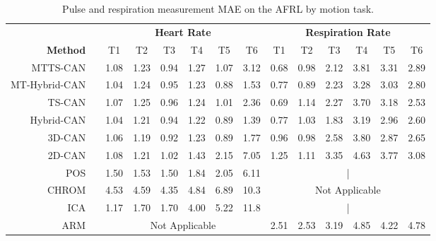 \documentclass{article}
\begin{document}
\begin{table*}[t]
	\caption{Pulse and respiration measurement MAE on the AFRL by motion task.}
	\label{tab:tasks}
	\centering
	\small
	\setlength\tabcolsep{3pt} \begin{tabular}{rc|cccccc|cccccc}
	\toprule
		&& \multicolumn{6}{c}{\textbf{Heart Rate}} &  \multicolumn{6}{c}{\textbf{Respiration Rate}}  \\
        \textbf{Method} && T1 & T2  & T3 & T4 & T5 & T6 &  T1 & T2  & T3 & T4 & T5 & T6 \\ \hline \hline
        MTTS-CAN && 1.08 & 1.23 & 0.94 & 1.27 & 1.07 & 3.12 & 0.68 & 0.98 & 2.12 & 3.81 & 3.31 & 2.89 \\
        MT-Hybrid-CAN && 1.04 & 1.24 & 0.95 & 1.23 & 0.88 & 1.53 & 0.77 & 0.89 & 2.23 & 3.28 & 3.03 & 2.80 \\
        TS-CAN && 1.07 & 1.25 & 0.96 & 1.24 & 1.01 & 2.36 & 0.69 & 1.14 & 2.27 & 3.70 & 3.18 & 2.53 \\
        Hybrid-CAN && 1.04 & 1.21 & 0.94 & 1.22 & 0.89 & 1.39 & 0.77 & 1.03 & 1.83 & 3.19 & 2.96 & 2.60 \\
        3D-CAN && 1.06 & 1.19 & 0.92 & 1.23 & 0.89 & 1.77 & 0.96 & 0.98 & 2.58 & 3.80 & 2.87 & 2.65 \\ \hdashline

        2D-CAN \citep{chen2018deepphys} && 1.08 & 1.21 & 1.02 & 1.43 & 2.15 & 7.05 & 1.25 & 1.11 & 3.35 & 4.63 & 3.77 & 3.08 \\
        POS \citep{wang2016algorithmic} && 1.50 & 1.53 & 1.50 & 1.84 & 2.05 & 6.11 & \multicolumn{6}{c}{|} \\
        CHROM \citep{de2013robust} && 4.53 & 4.59 & 4.35 & 4.84 & 6.89 & 10.3 & \multicolumn{6}{c}{Not Applicable}  \\
        ICA \citep{poh2010advancements} && 1.17 & 1.70 & 1.70 & 4.00 & 5.22 & 11.8 & \multicolumn{6}{c}{|} \\
        ARM \citep{tarassenko2014non} &&& \multicolumn{4}{c}{\multirow{1}{*}{Not Applicable}} && 2.51 & 2.53 & 3.19 & 4.85 & 4.22 & 4.78 \\ \bottomrule 
   \end{tabular}
    \vspace{-0.3cm}
\end{table*}
\end{document}
